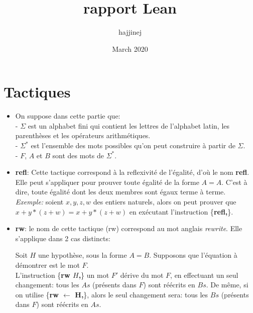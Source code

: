 \documentclass{article}
\title{rapport Lean}
\author{hajjinej }
\date{March 2020}
\begin{document}
\maketitle

\section{Tactiques}
\begin{itemize}
    \item On suppose dans cette partie que:\\ - $\Sigma$ est un alphabet fini qui contient les lettres de l'alphabet latin, les parenthèses et les opérateurs arithmétiques.\\
    - $\Sigma^*$ est l'ensemble des mots possibles qu'on peut construire à partir de $\Sigma$.\\
    - $F$, $A$ et $B$ sont des mots de $\Sigma^*$.
    \item {\large \textbf{refl}}: Cette tactique correspond à la reflexivité de l'égalité, d'où le nom \textbf{refl}. Elle peut s'appliquer pour prouver toute égalité de la forme $A=A$. C'est à dire, toute égalité dont les deux membres sont égaux terme à terme. \\
    \textit{Exemple:} soient $x,y,z,w$ des entiers naturels, alors on peut prouver que $x+y*(z+w)=x+y*(z+w)$ en exécutant l'instruction \big\{\textbf{refl,}\big\}.
    \item {\large\textbf{rw}}: le nom de cette tactique (rw) correspond au mot anglais \textit{rewrite}. Elle s'applique dans 2 cas distincts:
    
     \hspace{1cm} Soit $H$ une hypothèse, sous la forme $A=B$. 
    Supposons que l'équation à démontrer est le mot $F$. \\ L'instruction \big\{\textbf{rw $H$,}\big\} un mot $F'$ dérive du mot $F$, en effectuant un seul changement: tous les $As$ (présents dans $F$) sont réécrits en $Bs$. De même, si on utilise \big\{\textbf{rw $\leftarrow$ H,}\big\}, alors le seul changement sera: tous les $Bs$ (présents dans $F$) sont réécrits en $As$.
    

\end{itemize}
\end{document}
